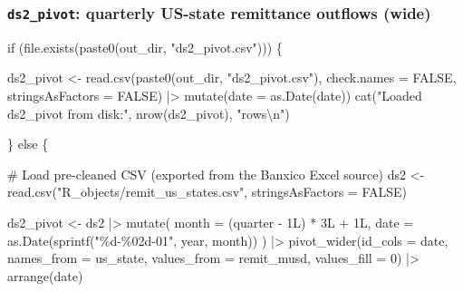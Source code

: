\documentclass[
  11pt,
  letterpaper,
  DIV=11,
  numbers=noendperiod]{scrartcl}
\newenvironment{Shaded}{}{}
\newcommand{\AttributeTok}[1]{\textcolor[rgb]{0.84,0.23,0.29}{#1}}
\newcommand{\CommentTok}[1]{\textcolor[rgb]{0.42,0.45,0.49}{#1}}
\newcommand{\ConstantTok}[1]{\textcolor[rgb]{0.00,0.36,0.77}{#1}}
\newcommand{\ControlFlowTok}[1]{\textcolor[rgb]{0.84,0.23,0.29}{#1}}
\newcommand{\DecValTok}[1]{\textcolor[rgb]{0.00,0.36,0.77}{#1}}
\newcommand{\FunctionTok}[1]{\textcolor[rgb]{0.44,0.26,0.76}{#1}}
\newcommand{\NormalTok}[1]{\textcolor[rgb]{0.14,0.16,0.18}{#1}}
\newcommand{\OtherTok}[1]{\textcolor[rgb]{0.44,0.26,0.76}{#1}}
\newcommand{\SpecialCharTok}[1]{\textcolor[rgb]{0.00,0.36,0.77}{#1}}
\newcommand{\StringTok}[1]{\textcolor[rgb]{0.01,0.18,0.38}{#1}}
\begin{document}
\subsubsection{\texorpdfstring{\texttt{ds2\_pivot}: quarterly US-state
remittance outflows
(wide)}{ds2\_pivot: quarterly US-state remittance outflows (wide)}}\label{ds2_pivot-quarterly-us-state-remittance-outflows-wide}

\begin{Shaded}
\begin{Highlighting}[]
\ControlFlowTok{if}\NormalTok{ (}\FunctionTok{file.exists}\NormalTok{(}\FunctionTok{paste0}\NormalTok{(out\_dir, }\StringTok{"ds2\_pivot.csv"}\NormalTok{))) \{}

\NormalTok{  ds2\_pivot }\OtherTok{\textless{}{-}} \FunctionTok{read.csv}\NormalTok{(}\FunctionTok{paste0}\NormalTok{(out\_dir, }\StringTok{"ds2\_pivot.csv"}\NormalTok{),}
                         \AttributeTok{check.names =} \ConstantTok{FALSE}\NormalTok{,}
                         \AttributeTok{stringsAsFactors =} \ConstantTok{FALSE}\NormalTok{) }\SpecialCharTok{|\textgreater{}}
    \FunctionTok{mutate}\NormalTok{(}\AttributeTok{date =} \FunctionTok{as.Date}\NormalTok{(date))}
  \FunctionTok{cat}\NormalTok{(}\StringTok{"Loaded ds2\_pivot from disk:"}\NormalTok{, }\FunctionTok{nrow}\NormalTok{(ds2\_pivot), }\StringTok{"rows}\SpecialCharTok{\textbackslash{}n}\StringTok{"}\NormalTok{)}

\NormalTok{\} }\ControlFlowTok{else}\NormalTok{ \{}

  \CommentTok{\# Load pre{-}cleaned CSV (exported from the Banxico Excel source)}
\NormalTok{  ds2 }\OtherTok{\textless{}{-}} \FunctionTok{read.csv}\NormalTok{(}\StringTok{"R\_objects/remit\_us\_states.csv"}\NormalTok{,}
                  \AttributeTok{stringsAsFactors =} \ConstantTok{FALSE}\NormalTok{)}

\NormalTok{  ds2\_pivot }\OtherTok{\textless{}{-}}\NormalTok{ ds2 }\SpecialCharTok{|\textgreater{}}
    \FunctionTok{mutate}\NormalTok{(}
      \AttributeTok{month =}\NormalTok{ (quarter }\SpecialCharTok{{-}} \DecValTok{1}\NormalTok{L) }\SpecialCharTok{*} \DecValTok{3}\NormalTok{L }\SpecialCharTok{+} \DecValTok{1}\NormalTok{L,}
      \AttributeTok{date  =} \FunctionTok{as.Date}\NormalTok{(}\FunctionTok{sprintf}\NormalTok{(}\StringTok{"\%d{-}\%02d{-}01"}\NormalTok{, year, month))}
\NormalTok{    ) }\SpecialCharTok{|\textgreater{}}
    \FunctionTok{pivot\_wider}\NormalTok{(}\AttributeTok{id\_cols =}\NormalTok{ date, }\AttributeTok{names\_from =}\NormalTok{ us\_state,}
                \AttributeTok{values\_from =}\NormalTok{ remit\_musd, }\AttributeTok{values\_fill =} \DecValTok{0}\NormalTok{) }\SpecialCharTok{|\textgreater{}}
    \FunctionTok{arrange}\NormalTok{(date)}


\end{Highlighting}
\end{Shaded}
\end{document}
